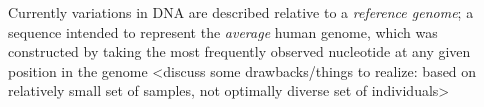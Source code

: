 Currently variations in DNA are described relative to a \emph{reference genome}; a sequence intended to represent the \emph{average} human genome, which was constructed by taking the most frequently observed nucleotide at any given  position in the genome
<discuss some drawbacks/things to realize: based on relatively small set of samples, not optimally diverse set of individuals>

